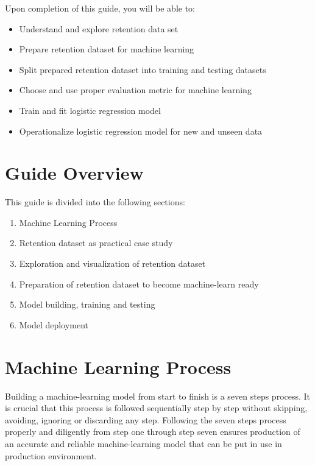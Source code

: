 \documentclass[12pt,a4paper,oneside]{book}
\begin{document}
\par Upon completion of this guide, you will be able to:

\begin{itemize}

\item Understand and explore retention data set 
\item Prepare retention dataset for machine learning 
\item Split prepared retention dataset into training and testing datasets
\item Choose and use proper evaluation metric for machine learning 
\item Train and fit logistic regression model
\item Operationalize logistic regression model for new and unseen data

\end{itemize}

\section{Guide Overview}

This guide is divided into the following sections:

\begin{enumerate}

\item Machine Learning Process 
\item Retention dataset as practical case study 
\item Exploration and visualization of retention dataset 
\item Preparation of retention dataset to become machine-learn ready
\item Model building, training and testing
\item Model deployment

\end{enumerate}

\section{Machine Learning Process}

Building a machine-learning model from start to finish is a seven steps process. It is crucial that this process is followed sequentially step by step without skipping, avoiding, ignoring or discarding any step. Following the seven steps process properly and diligently from step one through step seven ensures production of an accurate and reliable machine-learning model that can be put in use in production environment. 
\end{document}
